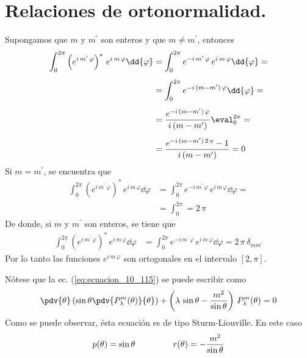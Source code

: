 \section{Relaciones de ortonormalidad.}
Supongamos que $m$ y $m^{\prime}$ son enteros y que $m \neq m^{\prime}$, entonces
\begin{align}
\int_{0}^{2 \pi} \left( e^{i \, m^{\prime} \, \varphi} \right)^{*} \, e^{i \, m \, \varphi} \dd{\varphi} &= \int_{0}^{2 \pi} e^{-i \, m^{\prime} \, \varphi} \, e^{i \, m \, \varphi} \dd{\varphi} = \nonumber \\[0.5em]
&= \int_{0}^{2 \pi} e^{-i \, (m - m^{\prime} )\, \varphi} \dd{\varphi} = \nonumber \\[0.5em]
&= \dfrac{e^{-i \, (m - m^{\prime} )\, \varphi}}{i \, (m - m^{\prime})} \eval_{0}^{2 \pi} = \nonumber \\[0.5em]
&= \dfrac{e^{-i \, (m - m^{\prime} )\, 2 \, \pi} - 1}{i \, (m - m^{\prime})} = 0 
\label{eq:ecuacion_10_119}
\end{align}
Si $m = m^{\prime}$, se encuentra que
\begin{align}
\int_{0}^{2 \pi} \left( e^{i \, m^{\prime} \, \varphi} \right)^{*} \, e^{i \, m \, \varphi} \dd{\varphi} &= \int_{0}^{2 \pi} e^{-i \, m^{\prime} \, \varphi} \, e^{i \, m \, \varphi} \dd{\varphi} = \nonumber \\[0.5em]
&= \int_{0}^{2 \pi} = 2 \, \pi
\label{eq:ecuacion_10_120}
\end{align}
De donde, si $m$ y $m^{\prime}$ son enteros, se tiene que
\begin{align}
\int_{0}^{2 \pi} \left( e^{i \, m^{\prime} \, \varphi} \right)^{*} \, e^{i \, m \, \varphi} \dd{\varphi} &= \int_{0}^{2 \pi} e^{-i \, m^{\prime} \, \varphi} \, e^{i \, m \, \varphi} \dd{\varphi} = 2 \, \pi \, \delta_{m m^{\prime}}
\label{eq:ecuacion_10_121}
\end{align}
Por lo tanto las funciones $e^{i \, m \, \varphi}$ son ortogonales en el intervalo $[2, \pi]$.
\par
Nótese que la ec. (\ref{eq:ecuacion_10_115}) se puede escribir como
\begin{align}
\pdv{\theta} \left( \sin \theta \pdv{P_{\lambda}^{m} (\theta)}{\theta} \right) + \left(\lambda \, \sin \theta - \dfrac{m^{2}}{\sin \theta} \right) \, P_{\lambda}^{m} (\theta) = 0
\label{eq:ecuacion_10_122}
\end{align}
Como se puede observar, ésta ecuación es de tipo Sturm-Liouville. En este caso
\begin{align*}
p(\theta) = \sin \theta \, \hspace{1.5cm} r(\theta) = - \dfrac{m^{2}}{\sin \theta}
\end{align*}
